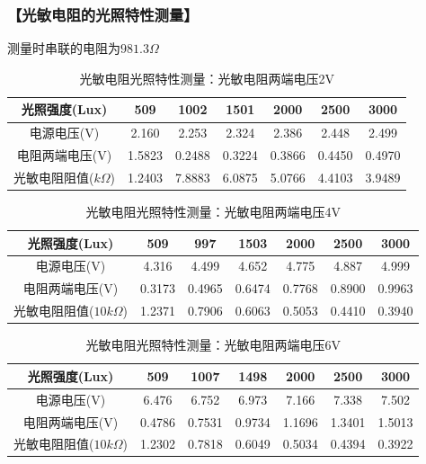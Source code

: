 \documentclass{ctexart}
\let\oldsubsubsection\subsubsection
\renewcommand{\subsubsection}[1]{\oldsubsubsection{\!\!\!\!\!\!【#1】}}
\begin{document}
\newpage
\subsubsection{光敏电阻的光照特性测量}

测量时串联的电阻为$981.3\Omega$

\begin{table}[H]
  \centering
  \begin{tabular}{|c|c|c|c|c|c|c|}
    \hline
    光照强度(Lux) &509&1002&1501&2000&2500&3000\\\hline
    电源电压(V) &2.160&2.253&2.324&2.386&2.448&2.499\\\hline
    电阻两端电压(V) &1.5823&0.2488&0.3224&0.3866&0.4450&0.4970\\\hline
    光敏电阻阻值($k\Omega$) & 1.2403&7.8883&6.0875&5.0766&4.4103&3.9489 \\\hline
  \end{tabular}
  \caption{光敏电阻光照特性测量：光敏电阻两端电压2V}
\end{table}

\begin{table}[H]
  \centering
  \begin{tabular}{|c|c|c|c|c|c|c|}
    \hline
    光照强度(Lux) &509&997&1503&2000&2500&3000\\\hline
    电源电压(V) &4.316&4.499&4.652&4.775&4.887&4.999\\\hline
    电阻两端电压(V) &0.3173&0.4965&0.6474&0.7768&0.8900&0.9963\\\hline
    光敏电阻阻值($10 k\Omega$) & 1.2371&0.7906&0.6063&0.5053&0.4410&0.3940\\\hline
  \end{tabular}
  \caption{光敏电阻光照特性测量：光敏电阻两端电压4V}
\end{table}

\begin{table}[H]
  \centering
  \begin{tabular}{|c|c|c|c|c|c|c|}
    \hline
    光照强度(Lux) &509&1007&1498&2000&2500&3000\\\hline
    电源电压(V) &6.476&6.752&6.973&7.166&7.338&7.502\\\hline
    电阻两端电压(V) &0.4786&0.7531&0.9734&1.1696&1.3401&1.5013\\\hline
    光敏电阻阻值($10k\Omega$) & 1.2302&0.7818&0.6049&0.5034&0.4394&0.3922\\\hline
  \end{tabular}
  \caption{光敏电阻光照特性测量：光敏电阻两端电压6V}
\end{table}
\end{document}
